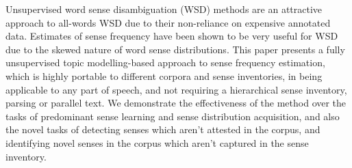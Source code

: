 Unsupervised word sense disambiguation (WSD) methods are an attractive approach to all-words WSD due to their non-reliance on expensive annotated data. Estimates of sense frequency have been shown to be very useful for WSD due to the skewed nature of word sense distributions. This paper presents a fully unsupervised topic modelling-based approach to sense frequency estimation, which is highly portable to different corpora and sense inventories, in being applicable to any part of speech, and not requiring a hierarchical sense inventory, parsing or parallel text.  We demonstrate the effectiveness of the method over the tasks of predominant sense learning and sense distribution acquisition, and also the novel tasks of detecting senses which aren't attested in the corpus, and identifying novel senses in the corpus which aren't captured in the sense inventory.
